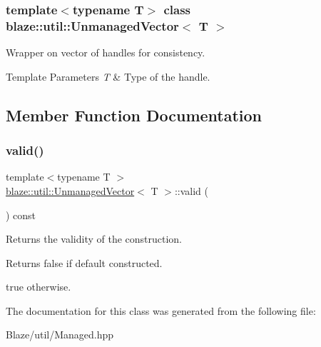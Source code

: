 \subsubsection*{template$<$typename T$>$\newline
class blaze\+::util\+::\+Unmanaged\+Vector$<$ T $>$}

Wrapper on vector of handles for consistency. 


\begin{DoxyTemplParams}{Template Parameters}
{\em T} & Type of the handle. \\
\hline
\end{DoxyTemplParams}


\subsection{Member Function Documentation}
\mbox{\label{classblaze_1_1util_1_1UnmanagedVector_a13e031e44e8ddfa77492bedbf1c82780}} 
\subsubsection{\texorpdfstring{valid()}{valid()}}
{\footnotesize\ttfamily template$<$typename T $>$ \\
\hyperlink{classblaze_1_1util_1_1UnmanagedVector}{blaze\+::util\+::\+Unmanaged\+Vector}$<$ T $>$\+::valid (\begin{DoxyParamCaption}{ }\end{DoxyParamCaption}) const\hspace{0.3cm}{\ttfamily [inline]}}



Returns the validity of the construction. 

\begin{DoxyReturn}{Returns}
false if default constructed. 

true otherwise. 
\end{DoxyReturn}


The documentation for this class was generated from the following file\+:\begin{DoxyCompactItemize}
\item 
Blaze/util/Managed.\+hpp\end{DoxyCompactItemize}
